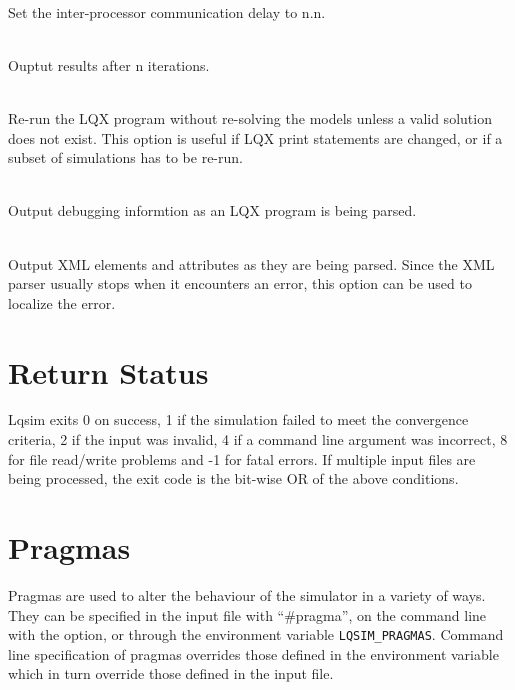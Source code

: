 \begin{description}
\begin{description}
  \end{description}
\item[\longopt{global-delay}]~\\
Set the inter-processor communication delay to n.n.
\item[\longopt{print-interval}]~\\
Ouptut results after n iterations.
\item[\longopt{restart}]~\\
Re-run the LQX program without re-solving the models unless a valid solution does not exist.  
This option is useful if LQX print statements are changed, or if a subset of simulations has to be re-run.
\item[\longopt{debug-lqx}]~\\
Output debugging informtion as an LQX program is being parsed.
\item[\longopt{debug-xml}]~\\
Output XML elements and attributes as they are being parsed.   Since the XML parser usually stops when it encounters an error,
this option can be used to localize the error.
\end{description}

\section{Return Status}
\label{sec:lqsim-return-status}

Lqsim exits 0 on success, 1 if the simulation
failed to meet the convergence criteria, 2
if the input was invalid, 4 if a command line
argument was incorrect, 8 for file
read/write problems and -1 for fatal errors.  If
multiple input files are being processed, the
exit code is the bit-wise OR of the above conditions.

\section{Pragmas}
\label{sec:lqsim-pragmas}

Pragmas are used to alter the behaviour of the simulator
in a variety of ways.  They can be specified in the input file with
``\#pragma'', on the command line with the  option, or
through the environment variable
\texttt{LQSIM\_PRAGMAS}.
Command line specification of pragmas overrides
those defined in the environment variable which in turn override those defined in the input
file.

